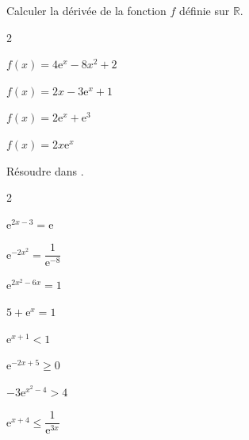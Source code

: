 \documentclass[12pt,a4paper]{article}  %
\begin{document}
Calculer la dérivée de la fonction $f$ définie sur $\mathbb{R}$.
\begin{multicols}{2}
	\begin{enumMet}
		\item $f(x)=4 \mathrm{e}^x-8 x^2+2$
		\item {} $f(x)=2x-3 \mathrm{e}^x+1$
		\item $f(x)=2\mathrm{e}^x+\mathrm{e}^3$
		\item $f(x)=2x \mathrm{e}^x$
	\end{enumMet}
\end{multicols}

Résoudre dans \R.
\begin{multicols}{2}
	\begin{enumMet}
		\item $\mathrm{e}^{2x-3}=\mathrm{e}$
		\item $\mathrm{e}^{-2x^2}=\dfrac{1}{\mathrm{e}^{-8}}$
		\item {} $\mathrm{e}^{2x^2-6x}=1$
		\item $5+\mathrm{e}^x=1$
		\item $\mathrm{e}^{x+1}<1$
		\item $\mathrm{e}^{-2 x+5} \geqslant 0$
		\item $-3 \mathrm{e}^{x^2-4}>4$
		\item $\mathrm{e}^{x+4} \leqslant \dfrac{1}{\mathrm{e}^{3 x}}$
	\end{enumMet}
\end{multicols}
\end{document}
